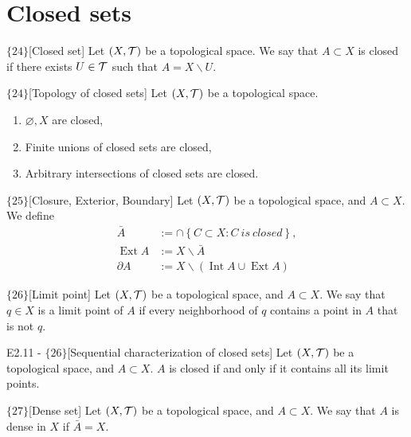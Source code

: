 \documentclass{article}
\begin{document}
\section{Closed sets}

\begin{flexidefinition}{$\{24\}$}[Closed set]
    Let $(X,\mathcal{T})$ be a topological space. We say that $A \subset X$ is closed if there exists $U \in \mathcal{T}$ such that $A = X \backslash U$.
\end{flexidefinition}

\begin{flexilemma}{$\{24\}$}[Topology of closed sets]
    Let $(X,\mathcal{T})$ be a topological space.
    \begin{enumerate}
        \item $\varnothing, X$ are closed,
        \item Finite unions of closed sets are closed,
        \item Arbitrary intersections of closed sets are closed.
    \end{enumerate}
\end{flexilemma}

\begin{flexidefinition}{$\{25\}$}[Closure, Exterior, Boundary]
    Let $(X,\mathcal{T})$ be a topological space, and $A \subset X$. We define
    \begin{align}
        \bar A &:= \cap \left\{ C \subset X : C \ is \ closed \right\},\\
        \operatorname{Ext} A &:=  X \backslash \bar A\\
        \partial A &:= X \backslash (\operatorname{Int} A \cup \operatorname{Ext} A )
    \end{align}
\end{flexidefinition}

\begin{flexidefinition}{$\{26\}$}[Limit point]
    Let $(X,\mathcal{T})$ be a topological space, and $A \subset X$. We say that $q \in X$ is a limit point of $A$ if every neighborhood of $q$ contains a point in $A$ that is not $q$.
\end{flexidefinition}

\begin{flexilemma}{E2.11 - $\{26\}$}[Sequential characterization of closed sets]
    Let $(X,\mathcal{T})$ be a topological space, and $A \subset X$. $A$ is closed if and only if it contains all its limit points.
\end{flexilemma}

\begin{flexidefinition}{$\{27\}$}[Dense set]
    Let $(X,\mathcal{T})$ be a topological space, and $A \subset X$. We say that $A$ is dense in $X$ if $\bar A = X$.
\end{flexidefinition}
\end{document}
